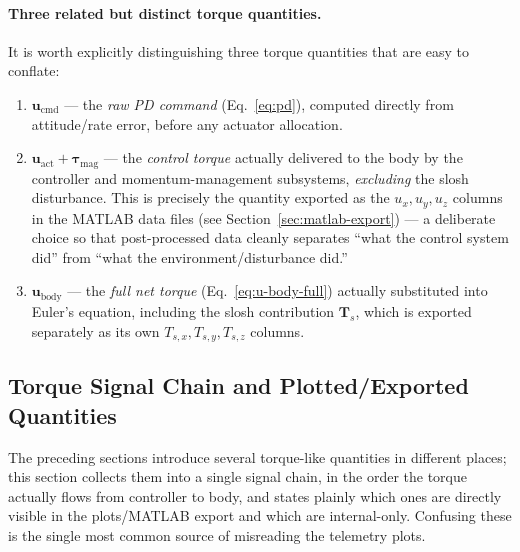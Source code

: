 \paragraph{Three related but distinct torque quantities.} It is worth
explicitly distinguishing three torque quantities that are easy to
conflate:
\begin{enumerate}\setlength{\itemsep}{2pt}
  \item $\bm{u}_{\text{cmd}}$ --- the \emph{raw PD command}
        (Eq.~\ref{eq:pd}), computed directly from attitude/rate error,
        before any actuator allocation.
  \item $\bm{u}_{\text{act}} + \bm{\tau}_{\text{mag}}$ --- the
        \emph{control torque} actually delivered to the body by the
        controller and momentum-management subsystems, \emph{excluding}
        the slosh disturbance. This is precisely the quantity exported
        as the $u_x, u_y, u_z$ columns in the MATLAB data files (see
        Section~\ref{sec:matlab-export}) — a deliberate choice so that
        post-processed data cleanly separates ``what the control system
        did'' from ``what the environment/disturbance did.''
  \item $\bm{u}_{\text{body}}$ --- the \emph{full net torque}
        (Eq.~\ref{eq:u-body-full}) actually substituted into Euler's
        equation, including the slosh contribution $\bm{T}_{\!s}$, which
        is exported separately as its own $T_{s,x}, T_{s,y}, T_{s,z}$
        columns.
\end{enumerate}


\subsection{Torque Signal Chain and Plotted/Exported Quantities}
\label{sec:torque-chain}

The preceding sections introduce several torque-like quantities in
different places; this section collects them into a single signal
chain, in the order the torque actually flows from controller to body,
and states plainly which ones are directly visible in the plots/MATLAB
export and which are internal-only. Confusing these is the single most
common source of misreading the telemetry plots.

